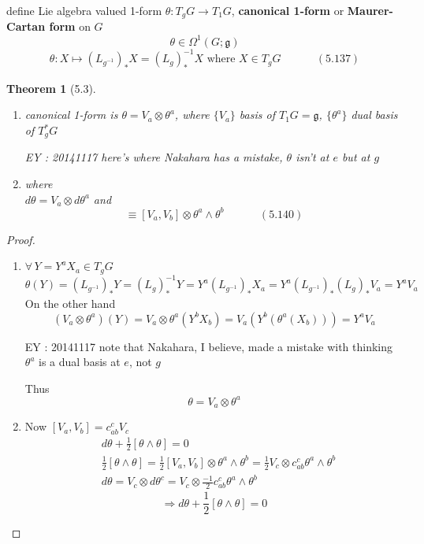 \documentclass{book}
\newtheorem{theorem}{Theorem}
\begin{document}
define Lie algebra valued 1-form $\theta: T_gG \to T_1G$, \textbf{canonical 1-form} or \textbf{Maurer-Cartan form} on $G$ \\
\[
\theta \in \Omega^1(G;\mathfrak{g})
\]
\begin{equation}
  \theta : X \mapsto (L_{g^{-1}})_* X = (L_g)^{-1}_* X \text{ where } X \in T_gG \quad \quad \quad \, (5.137)
\end{equation}

\begin{theorem}[5.3] 
\begin{enumerate}
\item[(a)] canonical 1-form is $\theta = V_a \otimes \theta^a$, where $\lbrace V_a \rbrace$ basis of $T_1G = \mathfrak{g}$, $\lbrace \theta^a \rbrace$ dual basis of $T^*_gG$

EY : 20141117 here's where Nakahara has a mistake, $\theta$ isn't at $e$ but at $g$
\item[(b)] where \\
$d\theta = V_a\otimes d\theta^a$ and 
\begin{equation}
  [ \theta \wedge \theta ] \equiv [ V_{a} , V_{b} ] \otimes \theta^{a} \wedge \theta^{b} \quad \quad \quad \, (5.140)
\end{equation}
\end{enumerate}
\end{theorem}

\begin{proof}
  \begin{enumerate}
\item[(a)] $\forall \, Y = Y^a X_a \in T_gG$
\[
\theta(Y) = (L_{g^{-1}})_* Y = (L_g)^{-1}_* Y = Y^a(L_{g^{-1}})_* X_a = Y^a (L_{g^{-1}})_* (L_g)_* V_a = Y^a V_a
\]
On the other hand
\[
(V_a \otimes \theta^a)(Y) = V_a \otimes \theta^a(Y^b X_b) = V_a (Y^b(\theta^a(X_b))) = Y^a V_a
\]

EY : 20141117 note that Nakahara, I believe, made a mistake with thinking $\theta^a$ is a dual basis at $e$, not $g$

Thus
\[
\boxed{ \theta = V_a \otimes \theta^a }
\]


\item[(b)] Now $[V_a,V_b] = c^c_{ab}V_c$
\[
\begin{aligned}
  & d\theta + \frac{1}{2} [ \theta \wedge \theta ] = 0 \\
  & \frac{1}{2} [ \theta \wedge \theta ] = \frac{1}{2} [V_a,V_b] \otimes \theta^a \wedge \theta^b = \frac{1}{2} V_c \otimes c^c_{ab} \theta^a \wedge \theta^b \\ 
  & d\theta = V_c \otimes d\theta^c = V_c \otimes \frac{-1}{2} c^c_{ab} \theta^a \wedge \theta^b 
\end{aligned}
\]
\[
\Longrightarrow \boxed{ d\theta + \frac{1}{2} [ \theta \wedge \theta ] = 0  }
\]
\end{enumerate}
\end{proof}
\end{document}
